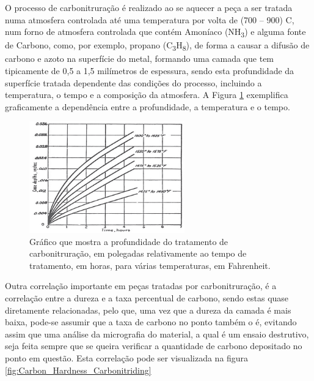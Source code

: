 \par
O processo de carbonitruração é realizado ao se aquecer a peça a ser tratada numa atmosfera controlada até uma temperatura por volta de (700 – 900) \textdegree C, num forno de atmosfera controlada que contém Amoníaco (NH\textsubscript{3}) e alguma fonte de Carbono, como, por exemplo, propano (C\textsubscript{3}H\textsubscript{8}), de forma a causar a difusão de carbono e azoto na superfície do metal, formando uma camada que tem tipicamente de 0,5 a 1,5 milímetros de espessura\cite{Rajan2011}, sendo esta profundidade da superfície tratada dependente das condições do processo, incluindo a temperatura, o tempo e a composição da atmosfera. A Figura \ref{fig:Carbonitriding_depth} exemplifica graficamente a dependência entre a profundidade, a temperatura e o tempo.
\begin{figure}[htb]
    \centering
    \includegraphics[width = 0.6\textwidth]{Figures/Cap2/Carbonitriding_depth.png}
    \caption[Composição de carbono e azoto em relação à profundidade de tratamento]%
    {Gráfico que mostra a profundidade do tratamento de carbonitruração, em polegadas relativamente ao tempo de tratamento, em horas, para várias temperaturas, em Fahrenheit.\cite{Herring2011}}
    \label{fig:Carbonitriding_depth}
\end{figure}%
\par
Outra correlação importante em peças tratadas por carbonitruração, é a correlação entre a dureza e a taxa percentual de carbono, sendo estas quase diretamente relacionadas, pelo que, uma vez que a dureza da camada é mais baixa, pode-se assumir que a taxa de carbono no ponto também o é, evitando assim que uma análise da micrografia do material, a qual é um ensaio destrutivo, seja feita sempre que se queira verificar a quantidade de carbono depositado no ponto em questão. Esta correlação pode ser visualizada na figura \ref{fig:Carbon_Hardness_Carbonitriding}
